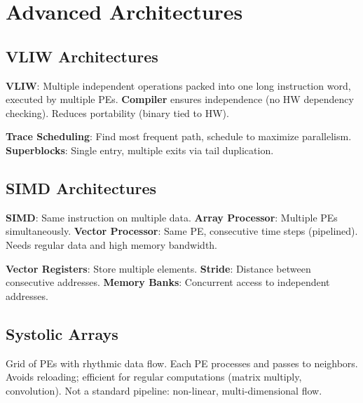 \section{Advanced Architectures}

\subsection{VLIW Architectures}

\begin{definition}
	\textbf{VLIW}: Multiple independent operations packed into one long instruction word, executed by multiple PEs. \textbf{Compiler} ensures independence (no HW dependency checking). Reduces portability (binary tied to HW).
\end{definition}

\begin{definition}
	\textbf{Trace Scheduling}: Find most frequent path, schedule to maximize parallelism.
	\textbf{Superblocks}: Single entry, multiple exits via tail duplication.
\end{definition}

\subsection{SIMD Architectures}

\begin{definition}
	\textbf{SIMD}: Same instruction on multiple data.
	\textbf{Array Processor}: Multiple PEs simultaneously.
	\textbf{Vector Processor}: Same PE, consecutive time steps (pipelined). Needs regular data and high memory bandwidth.
\end{definition}

\begin{definition}
	\textbf{Vector Registers}: Store multiple elements.
	\textbf{Stride}: Distance between consecutive addresses.
	\textbf{Memory Banks}: Concurrent access to independent addresses.
\end{definition}

\subsection{Systolic Arrays}

\begin{definition}
	Grid of PEs with rhythmic data flow. Each PE processes and passes to neighbors. Avoids reloading; efficient for regular computations (matrix multiply, convolution). Not a standard pipeline: non-linear, multi-dimensional flow.
\end{definition}

